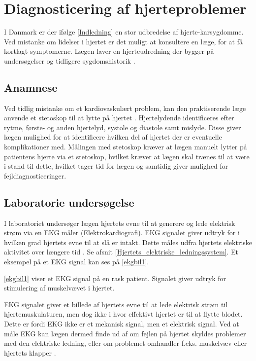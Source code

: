 \section{Diagnosticering af hjerteproblemer}

I Danmark er der ifølge \ref{Indledning}  en stor udbredelse af hjerte-karsygdomme. Ved mistanke om lidelser i hjertet er det muligt at konsultere en læge, for at få kortlagt symptomerne. Lægen laver en hjerteudredning der bygger på undersøgelser og tidligere sygdomshistorik \cite{hjerud}.

\subsection{Anamnese}
Ved tidlig mistanke om et kardiovaskulært problem, kan den praktiserende læge anvende et stetoskop til at lytte på hjertet \cite{subob}. Hjertelydende identificeres efter rytme, første- og anden hjertelyd, systole og diastole samt mislyde. Disse giver lægen mulighed for at identificere hvilken del af hjertet der er eventuelle komplikationer med. Målingen med stetoskop kræver at lægen manuelt lytter på patientens hjerte via et stetoskop, hvilket kræver at lægen skal trænes til at være i stand til dette, hvilket tager tid for lægen og samtidig giver mulighed for fejldiagnosticeringer. 

\subsection{Laboratorie undersøgelse}
I laboratoriet undersøger lægen hjertets evne til at generere og lede elektrisk strøm via en EKG måler (Elektrokardiografi). EKG signalet giver udtryk for i hvilken grad hjertets evne til at slå er intakt. Dette måles udfra hjertets elektriske aktivitet over længere tid \cite{ekg}. Se afsnit \ref{Hjertets_elektriske_ledningssystem}. Et eksempel på et EKG signal kan ses på \ref{ekgbil1}. 

\label{ekgbil1}
\ref{ekgbil1} viser et EKG signal på en rask patient. Signalet giver udtryk for stimulering af muskelvævet i hjertet. 

EKG signalet giver et billede af hjertets evne til at lede elektrisk strøm til hjertemuskulaturen, men dog ikke i hvor effektivt hjertet er til at flytte blodet. Dette er fordi EKG ikke er et mekanisk signal, men et elektrisk signal. Ved at måle EKG kan lægen dermed finde ud af om fejlen på hjertet skyldes problemer med den elektriske ledning, eller om problemet omhandler f.eks. muskelvæv eller hjertets klapper \cite{ekg}. 

